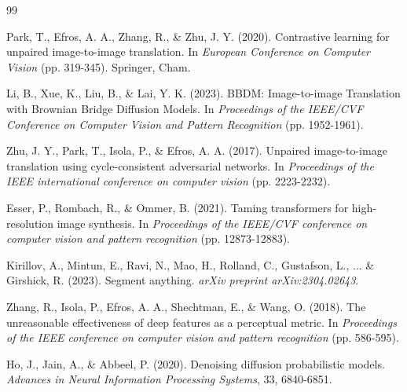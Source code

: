 \documentclass[12pt,a4paper]{article}
\begin{document}
\begin{thebibliography}{99}

Park, T., Efros, A. A., Zhang, R., \& Zhu, J. Y. (2020).
\newblock Contrastive learning for unpaired image-to-image translation.
\newblock In \textit{European Conference on Computer Vision} (pp. 319-345). Springer, Cham.

Li, B., Xue, K., Liu, B., \& Lai, Y. K. (2023).
\newblock BBDM: Image-to-image Translation with Brownian Bridge Diffusion Models.
\newblock In \textit{Proceedings of the IEEE/CVF Conference on Computer Vision and Pattern Recognition} (pp. 1952-1961).

Zhu, J. Y., Park, T., Isola, P., \& Efros, A. A. (2017).
\newblock Unpaired image-to-image translation using cycle-consistent adversarial networks.
\newblock In \textit{Proceedings of the IEEE international conference on computer vision} (pp. 2223-2232).

Esser, P., Rombach, R., \& Ommer, B. (2021).
\newblock Taming transformers for high-resolution image synthesis.
\newblock In \textit{Proceedings of the IEEE/CVF conference on computer vision and pattern recognition} (pp. 12873-12883).

Kirillov, A., Mintun, E., Ravi, N., Mao, H., Rolland, C., Gustafson, L., ... \& Girshick, R. (2023).
\newblock Segment anything.
\newblock \textit{arXiv preprint arXiv:2304.02643}.


Zhang, R., Isola, P., Efros, A. A., Shechtman, E., \& Wang, O. (2018).
\newblock The unreasonable effectiveness of deep features as a perceptual metric.
\newblock In \textit{Proceedings of the IEEE conference on computer vision and pattern recognition} (pp. 586-595).

Ho, J., Jain, A., \& Abbeel, P. (2020).
\newblock Denoising diffusion probabilistic models.
\newblock \textit{Advances in Neural Information Processing Systems}, 33, 6840-6851.

\end{thebibliography}
\end{document}
